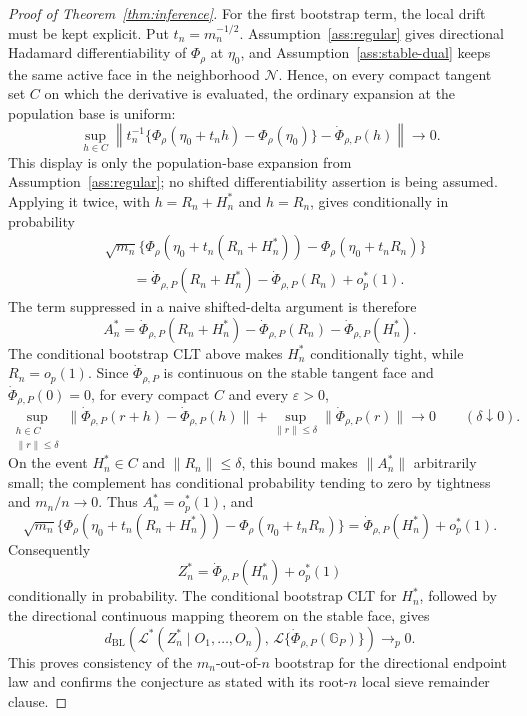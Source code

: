 \begin{proof}[Proof of Theorem~\ref{thm:inference}]
For the first bootstrap term, the local drift must be kept explicit.  Put \(t_n=m_n^{-1/2}\).  Assumption~\ref{ass:regular} gives directional Hadamard differentiability of \(\Phi_\rho\) at \(\eta_0\), and Assumption~\ref{ass:stable-dual} keeps the same active face in the neighborhood \(\mathcal N\).  Hence, on every compact tangent set \(C\) on which the derivative is evaluated, the ordinary expansion at the population base is uniform:
\[
\sup_{h\in C}
\left\|t_n^{-1}\{\Phi_\rho(\eta_0+t_n h)-\Phi_\rho(\eta_0)\}
-\dot\Phi_{\rho,P}(h)\right\|\to0 .
\]
This display is only the population-base expansion from Assumption~\ref{ass:regular}; no shifted differentiability assertion is being assumed.  Applying it twice, with \(h=R_n+H_n^*\) and \(h=R_n\), gives conditionally in probability
\[
\begin{aligned}
&\sqrt{m_n}\{\Phi_\rho(\eta_0+t_n(R_n+H_n^*))
-\Phi_\rho(\eta_0+t_nR_n)\}\\
&\qquad =
\dot\Phi_{\rho,P}(R_n+H_n^*)-\dot\Phi_{\rho,P}(R_n)+o_p^*(1).
\end{aligned}
\]
The term suppressed in a naive shifted-delta argument is therefore
\[
A_n^*=
\dot\Phi_{\rho,P}(R_n+H_n^*)-\dot\Phi_{\rho,P}(R_n)
-\dot\Phi_{\rho,P}(H_n^*).
\]
The conditional bootstrap CLT above makes \(H_n^*\) conditionally tight, while \(R_n=o_p(1)\).  Since \(\dot\Phi_{\rho,P}\) is continuous on the stable tangent face and \(\dot\Phi_{\rho,P}(0)=0\), for every compact \(C\) and every \(\varepsilon>0\),
\[
\sup_{\substack{h\in C\\ \|r\|\le\delta}}
\|\dot\Phi_{\rho,P}(r+h)-\dot\Phi_{\rho,P}(h)\|
+\sup_{\|r\|\le\delta}\|\dot\Phi_{\rho,P}(r)\|
\to0
\qquad(\delta\downarrow0).
\]
On the event \(H_n^*\in C\) and \(\|R_n\|\le\delta\), this bound makes \(\|A_n^*\|\) arbitrarily small; the complement has conditional probability tending to zero by tightness and \(m_n/n\to0\).  Thus \(A_n^*=o_p^*(1)\), and
\[
\sqrt{m_n}\{\Phi_\rho(\eta_0+t_n(R_n+H_n^*))
-\Phi_\rho(\eta_0+t_nR_n)\}
=\dot\Phi_{\rho,P}(H_n^*)+o_p^*(1).
\]
Consequently
\[
Z_n^*=\dot\Phi_{\rho,P}(H_n^*)+o_p^*(1)
\]
conditionally in probability.  The conditional bootstrap CLT for \(H_n^*\), followed by the directional continuous mapping theorem on the stable face, gives
\[
d_{\mathrm{BL}}\!\left(\mathcal L^*(Z_n^*\mid O_1,\ldots,O_n),\,
\mathcal L\{\dot\Phi_{\rho,P}(\mathbb G_P)\}\right)\to_p0.
\]
This proves consistency of the \(m_n\)-out-of-\(n\) bootstrap for the directional endpoint law and confirms the conjecture as stated with its root-\(n\) local sieve remainder clause.
\end{proof}

